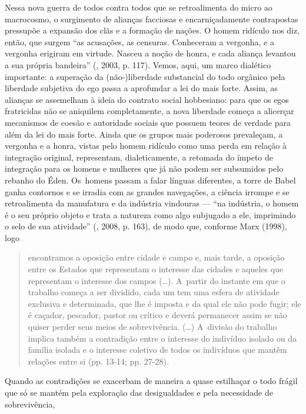 Nessa nova guerra de todos contra todos que se retroalimenta do micro ao
macrocosmo, o surgimento de alianças facciosas e encarniçadamente
contrapostas pressupõe a expansão dos clãs e a formação de nações. O
homem ridículo nos diz, então, que surgem ``as acusações, as censuras.
Conheceram a vergonha, e a vergonha erigiram em virtude. Nasceu a noção
de honra, e cada aliança levantou a sua própria bandeira'' (,
2003, p. 117). Vemos, aqui, um marco dialético importante: a superação
da \mbox{(não-)liberdade} substancial do todo orgânico pela liberdade subjetiva
do ego passa a aprofundar a lei do mais forte. Assim, as alianças se
assemelham à ideia do contrato social hobbesiano: para que os egos
fratricidas não se aniquilem completamente, a nova liberdade começa a
alicerçar mecanismos de coesão e autoridade sociais que possuem teores
de verdade para além da lei do mais forte. Ainda que os grupos mais
poderosos prevaleçam, a vergonha e a honra, vistas pelo homem ridículo
como uma perda em relação à integração original, representam,
dialeticamente, a retomada do ímpeto de integração para os homens e
mulheres que já não podem ser subsumidos pelo rebanho do Éden. Os~homens
passam a falar línguas diferentes, a torre de Babel ganha contornos e se
irradia com as grandes navegações, a ciência irrompe e se retroalimenta
da manufatura e da indústria vindouras --- ``na indústria, o homem é o
seu próprio objeto e trata a natureza como algo subjugado a ele,
imprimindo o selo de sua atividade'' (, 2008, p. 163), de modo que,
conforme Marx (1998), logo

\begin{quote}
encontramos a oposição entre cidade e campo e, mais tarde, a oposição
entre os Estados que representam o interesse das cidades e aqueles que
representam o interesse dos campos (\ldots). A~partir do instante em que o
trabalho começa a ser dividido, cada um tem uma esfera de atividade
exclusiva e determinada, que lhe é imposta e da qual ele não pode fugir;
ele é caçador, pescador, pastor ou crítico e deverá permanecer assim se
não quiser perder seus meios de sobrevivência. (\ldots) A~divisão do
trabalho implica também a contradição entre o interesse do indivíduo
isolado ou da família isolada e o interesse coletivo de todos os
indivíduos que mantêm relações entre si (pp. 13-14; pp. 27-28).
\end{quote}

Quando as contradições se exacerbam de maneira a quase estilhaçar o todo
frágil que só se mantém pela exploração das desigualdades e pela
necessidade de sobrevivência,

